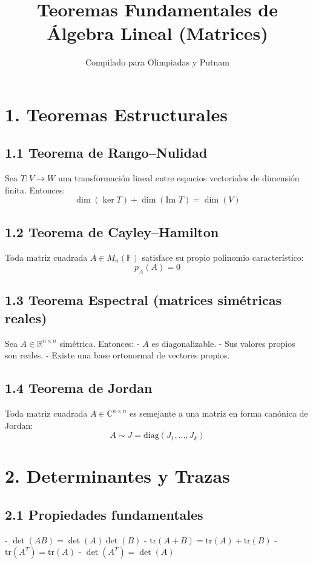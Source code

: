 \documentclass{article}
\title{Teoremas Fundamentales de Álgebra Lineal (Matrices)}
\author{Compilado para Olimpiadas y Putnam}
\begin{document}
\maketitle

\section*{1. Teoremas Estructurales}

\subsection*{1.1 Teorema de Rango–Nulidad}
Sea \( T: V \to W \) una transformación lineal entre espacios vectoriales de dimensión finita. Entonces:
\[
\dim(\ker T) + \dim(\text{Im } T) = \dim(V)
\]

\subsection*{1.2 Teorema de Cayley–Hamilton}
Toda matriz cuadrada \( A \in M_n(\mathbb{F}) \) satisface su propio polinomio característico:
\[
p_A(A) = 0
\]

\subsection*{1.3 Teorema Espectral (matrices simétricas reales)}
Sea \( A \in \mathbb{R}^{n \times n} \) simétrica. Entonces:
- \( A \) es diagonalizable.
- Sus valores propios son reales.
- Existe una base ortonormal de vectores propios.

\subsection*{1.4 Teorema de Jordan}
Toda matriz cuadrada \( A \in \mathbb{C}^{n \times n} \) es semejante a una matriz en forma canónica de Jordan:
\[
A \sim J = \text{diag}(J_1, \dots, J_k)
\]

\section*{2. Determinantes y Trazas}

\subsection*{2.1 Propiedades fundamentales}
- \(\det(AB) = \det(A)\det(B)\)
- \(\text{tr}(A + B) = \text{tr}(A) + \text{tr}(B)\)
- \(\text{tr}(A^T) = \text{tr}(A)\)
- \(\det(A^T) = \det(A)\)
\end{document}
